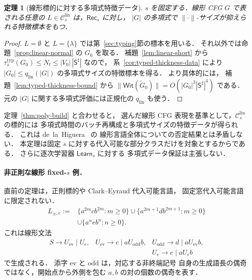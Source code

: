 \documentclass[11pt,a4paper]{ltjsarticle}
\newtheorem{theorem}{定理}[section]
\theoremstyle{remark}
\theoremstyle{plain}
\newcommand{\WitnessSet}{\mathsf{Wit}}
\newcommand{\lin}{\mathrm{lin}}
\newcommand{\Clin}[1]{\mathcal C_{#1}^{\lin}}
\begin{document}
\begin{theorem}[線形標的に対する多項式特徴データ]
\label{thm:linear-poly}
$s$ を固定する．線形 CFG $G$ で表される任意の
$L\in\Clin{s}$ は，$\mathsf{Rec}_s$ に対し，
$|G|$ の多項式で $\|\cdot\|$-サイズが抑えられる特徴標本をもつ．
\end{theorem}
\begin{proof}
$L=\emptyset$ と $L=\{\lambda\}$ では第~\ref{sec:typing}節の標本を用いる．
それ以外では命題~\ref{prop:linear-normal} の $G_0$ を取る．
補題~\ref{lem:linear-short} から
$\tau_s^{\mathrm{typ}}(G_0)\le N_t\le
|V_0|\,|\mathsf S^\sharp|$ なので，
系~\ref{cor:typed-thickness-data} により
$|G_0|\le q_{\mathrm{lin}}(|G|)$ の多項式サイズの特徴標本を得る．
より具体的には，
補題~\ref{lem:typed-thickness-bound} から
$\|\WitnessSet(\widetilde G_0)\|=O(|G_0|^3|\mathsf S^\sharp|^4)$ である．
元の $|G|$ に関する多項式評価には正規化の $q_{\mathrm{lin}}$ も使う．
\end{proof}

定理~\ref{thm:poly-build} と合わせると，
選んだ線形 CFG 表現を基準として，$\Clin{s}$ の標的には
多項式時間のバッチ再構成と多項式サイズの特徴データが得られる．
これは de~la~Higuera~\cite[Theorem~2]{higuera1997} の
線形言語全体についての否定結果とは矛盾しない．
本定理は固定 $s$ に対する代入可能な部分クラスだけを対象とするからである．
さらに逐次学習器 $\mathsf{Learn}_s$ に対する
多項式データ保証は主張しない．

\paragraph{非正則な線形 \texorpdfstring{fixed-$s$}{fixed-s} 例．}

直前の定理は，正則標的や Clark--Eyraud 代入可能言語，
固定窓代入可能言語に限定されない．
\[
\begin{split}
L_{\pm,e}:={}&
\{a^{2m}cb^{2m}:m\ge0\}
\cup
\{a^{2m+1}db^{2m+1}:m\ge0\}\\
&\cup
\{a^neb^n:n\ge0\}.
\end{split}
\]
これは線形文法
\[
\begin{array}{lll}
S\to U_{\mathrm{ev}}\mid U_e, &
U_{\mathrm{ev}}\to c\mid aU_{\mathrm{odd}}b, &
U_{\mathrm{odd}}\to d\mid aU_{\mathrm{ev}}b,\\[1mm]
&&U_e\to e\mid aU_eb
\end{array}
\]
で生成される．
添字 $\mathrm{ev}$ と $\mathrm{odd}$ は，対応する非終端記号
自身の生成語長の偶奇ではなく，開始点から外側を包む
$a,b$ の対の個数の偶奇を表す．
\end{document}
